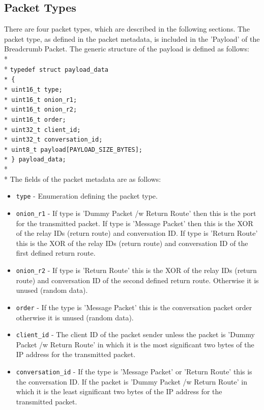 \documentclass{article}
\begin{document}
\subsection{Packet Types}
There are four packet types, which are described in the following sections. The packet type, as defined in the packet metadata, is included in the 'Payload' of the Breadcrumb Packet. The generic structure of the payload is defined as follows:\\*\\*
\texttt{\-\hspace{1cm}typedef struct payload\_data\\*
\-\hspace{1cm}\{\\*
\-\hspace{2cm}uint16\_t type;\\*
\-\hspace{2cm}uint16\_t onion\_r1;\\*
\-\hspace{2cm}uint16\_t onion\_r2;\\*
\-\hspace{2cm}uint16\_t order;\\*
\-\hspace{2cm}uint32\_t client\_id;\\*
\-\hspace{2cm}uint32\_t conversation\_id;\\*
\-\hspace{2cm}uint8\_t payload[PAYLOAD\_SIZE\_BYTES];\\*
\-\hspace{1cm}\} payload\_data;}\\*\\*
The fields of the packet metadata are as follows:
\begin{itemize}
	\item \texttt{type} - Enumeration defining the packet type.
	\item \texttt{onion\_r1} - If type is 'Dummy Packet /w Return Route' then this is the port for the transmitted packet. If type is 'Message Packet' then this is the XOR of the relay IDs (return route) and conversation ID. If
	type is 'Return Route' this is the XOR of the relay IDs (return route) and conversation ID of the first defined return route.
	\item \texttt{onion\_r2} - If type is 'Return Route' this is the XOR of the relay IDs (return route) and conversation ID of the second defined return route. Otherwise it is unused (random data).
	\item \texttt{order} - If the type is 'Message Packet' this is the conversation packet order otherwise it is unused (random data).
	\item \texttt{client\_id} - The client ID of the packet sender unless the packet is 'Dummy Packet /w Return Route' in which it is the most significant two bytes of the IP address for the transmitted packet.
	\item \texttt{conversation\_id} - If the type is 'Message Packet' or 'Return Route' this is the conversation ID. If the packet is 'Dummy Packet /w Return Route' in which it is the least significant two bytes of the IP address for the transmitted packet.
\end{itemize}
\end{document}
